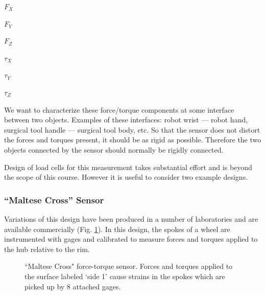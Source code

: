 $F_X$

$F_Y$

$F_Z$

$\tau_X$

$\tau_Y$

$\tau_Z$

We want to characterize these force/torque
 components at some interface between two
objects.  Examples of these interfaces: robot wrist --- robot hand,
surgical tool handle --- surgical tool body, etc.  So that the sensor
does not distort the forces and torques present, it should be as rigid
as possible.  Therefore the two objects connected by the sensor should
normally be rigidly connected.

Design of load cells for this measurement takes substantial effort
and is beyond the scope of this course. However it is useful
to consider two example designs.

\subsubsection{``Maltese Cross'' Sensor}

Variations of this design have been produced in a number of
laboratories and are available commercially (Fig. \ref{Maltese}).
In this design,
the spokes of a wheel are instrumented with gages and calibrated
to measure forces and torques applied to the hub relative to the rim.

\begin{figure}[ht]	%
\begin{center}
\caption{ ``Maltese Cross" force-torque sensor.  Forces and	%
torques applied to the surface labeled `side 1' cause strains in the	%
spokes which are picked up by 8 attached gages. }\label{Maltese}	%
\end{center}
\end{figure}	%

